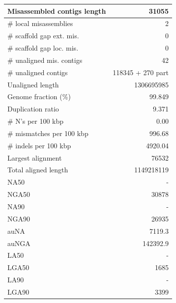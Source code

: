 \documentclass[12pt,a4paper]{article}
\begin{document}
\begin{table}[ht]
\begin{center}
\begin{tabular}{|l*{1}{|r}|}
Misassembled contigs length & 31055 \\ \hline
\# local misassemblies & 2 \\ \hline
\# scaffold gap ext. mis. & 0 \\ \hline
\# scaffold gap loc. mis. & 0 \\ \hline
\# unaligned mis. contigs & 42 \\ \hline
\# unaligned contigs & 118345 + 270 part \\ \hline
Unaligned length & 1306695985 \\ \hline
Genome fraction (\%) & 99.849 \\ \hline
Duplication ratio & 9.371 \\ \hline
\# N's per 100 kbp & 0.00 \\ \hline
\# mismatches per 100 kbp & 996.68 \\ \hline
\# indels per 100 kbp & 4920.04 \\ \hline
Largest alignment & 76532 \\ \hline
Total aligned length & 1149218119 \\ \hline
NA50 & - \\ \hline
NGA50 & 30878 \\ \hline
NA90 & - \\ \hline
NGA90 & 26935 \\ \hline
auNA & 7119.3 \\ \hline
auNGA & 142392.9 \\ \hline
LA50 & - \\ \hline
LGA50 & 1685 \\ \hline
LA90 & - \\ \hline
LGA90 & 3399 \\ \hline
\end{tabular}
\end{center}
\end{table}
\end{document}
